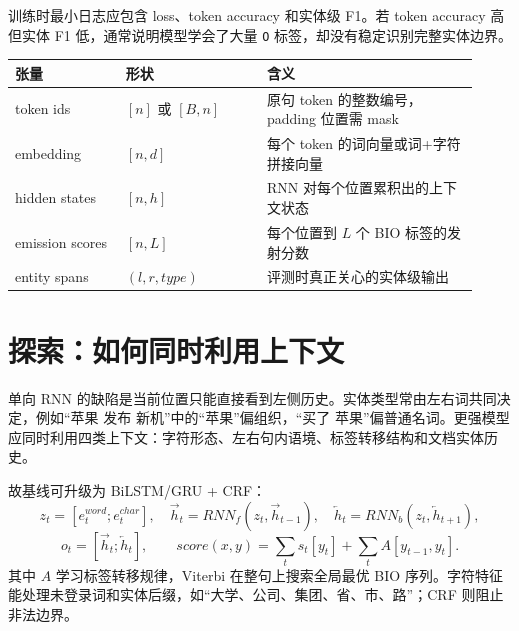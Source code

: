 \documentclass[UTF8,10pt,a4paper,fontset=none]{ctexart}
\begin{document}
训练时最小日志应包含 loss、token accuracy 和实体级 F1。若 token accuracy 高但实体 F1 低，通常说明模型学会了大量 \texttt{O} 标签，却没有稳定识别完整实体边界。

\small
\begin{tabular}{@{}p{0.22\linewidth}p{0.28\linewidth}p{0.42\linewidth}@{}}
\toprule
张量 & 形状 & 含义 \\
\midrule
token ids & $[n]$ 或 $[B,n]$ & 原句 token 的整数编号，padding 位置需 mask \\
embedding & $[n,d]$ & 每个 token 的词向量或词+字符拼接向量 \\
hidden states & $[n,h]$ & RNN 对每个位置累积出的上下文状态 \\
emission scores & $[n,L]$ & 每个位置到 $L$ 个 BIO 标签的发射分数 \\
entity spans & $(l,r,type)$ & 评测时真正关心的实体级输出 \\
\bottomrule
\end{tabular}
\normalsize

\clearpage

\section{探索：如何同时利用上下文}
单向 RNN 的缺陷是当前位置只能直接看到左侧历史。实体类型常由左右词共同决定，例如“苹果 发布 新机”中的“苹果”偏组织，“买了 苹果”偏普通名词。更强模型应同时利用四类上下文：字符形态、左右句内语境、标签转移结构和文档实体历史。

\begin{center}
\end{center}

故基线可升级为 BiLSTM/GRU + CRF：
\[
z_t=[e_t^{word};e_t^{char}],\quad
\overrightarrow h_t=RNN_f(z_t,\overrightarrow h_{t-1}),\quad
\overleftarrow h_t=RNN_b(z_t,\overleftarrow h_{t+1}),
\]
\[
o_t=[\overrightarrow h_t;\overleftarrow h_t],\qquad
score(x,y)=\sum_t s_t[y_t]+\sum_t A[y_{t-1},y_t].
\]
其中 $A$ 学习标签转移规律，Viterbi 在整句上搜索全局最优 BIO 序列。字符特征能处理未登录词和实体后缀，如“大学、公司、集团、省、市、路”；CRF 则阻止非法边界。
\end{document}
